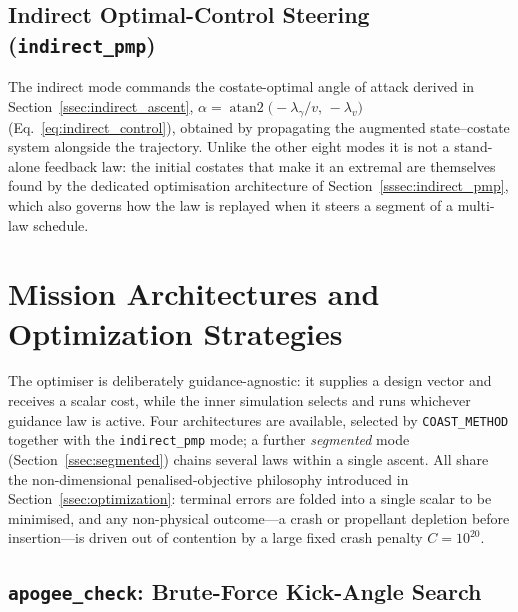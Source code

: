 \subsection{Indirect Optimal-Control Steering (\texttt{indirect\_pmp})}
\label{ssec:indirect_guidance}

The indirect mode commands the costate-optimal angle of attack derived in
Section~\ref{ssec:indirect_ascent},
$\alpha=\operatorname{atan2}\!\bigl(-\lambda_\gamma/v,\,-\lambda_v\bigr)$
(Eq.~\eqref{eq:indirect_control}), obtained by propagating the augmented
state--costate system alongside the trajectory. Unlike the other eight modes it is
not a stand-alone feedback law: the initial costates that make it an extremal are
themselves found by the dedicated optimisation architecture of
Section~\ref{sssec:indirect_pmp}, which also governs how the law is replayed when
it steers a segment of a multi-law schedule.

\section{Mission Architectures and Optimization Strategies}
\label{sec:optimization}

The optimiser is deliberately guidance-agnostic: it supplies a design vector and
receives a scalar cost, while the inner simulation selects and runs whichever
guidance law is active. Four architectures are available, selected by
\texttt{COAST\_METHOD} together with the \texttt{indirect\_pmp} mode; a further
\emph{segmented} mode (Section~\ref{ssec:segmented}) chains several laws within a
single ascent. All share the non-dimensional penalised-objective philosophy
introduced in Section~\ref{ssec:optimization}: terminal errors are folded into a
single scalar to be minimised, and any non-physical outcome---a crash or propellant
depletion before insertion---is driven out of contention by a large fixed crash
penalty $C=10^{20}$.

\subsection{\texttt{apogee\_check}: Brute-Force Kick-Angle Search}
\label{ssec:apogee_check}

